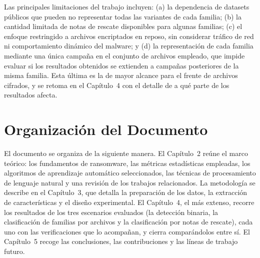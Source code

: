 Las principales limitaciones del trabajo incluyen: (a) la dependencia de datasets públicos que pueden no representar todas las variantes de cada familia; (b) la cantidad limitada de notas de rescate disponibles para algunas familias; (c) el enfoque restringido a archivos encriptados en reposo, sin considerar tráfico de red ni comportamiento dinámico del malware; y (d) la representación de cada familia mediante una única campaña en el conjunto de archivos empleado, que impide evaluar si los resultados obtenidos se extienden a campañas posteriores de la misma familia. Esta última es la de mayor alcance para el frente de archivos cifrados, y se retoma en el Capítulo~4 con el detalle de a qué parte de los resultados afecta.

\section{Organización del Documento}

El documento se organiza de la siguiente manera. El Capítulo~2 reúne el marco teórico: los fundamentos de ransomware, las métricas estadísticas empleadas, los algoritmos de aprendizaje automático seleccionados, las técnicas de procesamiento de lenguaje natural y una revisión de los trabajos relacionados. La metodología se describe en el Capítulo~3, que detalla la preparación de los datos, la extracción de características y el diseño experimental. El Capítulo~4, el más extenso, recorre los resultados de los tres escenarios evaluados (la detección binaria, la clasificación de familias por archivos y la clasificación por notas de rescate), cada uno con las verificaciones que lo acompañan, y cierra comparándolos entre sí. El Capítulo~5 recoge las conclusiones, las contribuciones y las líneas de trabajo futuro.
